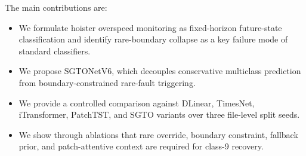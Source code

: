 The main contributions are:
\begin{itemize}
\item We formulate hoister overspeed monitoring as fixed-horizon future-state classification and identify rare-boundary collapse as a key failure mode of standard classifiers.
\item We propose SGTONetV6, which decouples conservative multiclass prediction from boundary-constrained rare-fault triggering.
\item We provide a controlled comparison against DLinear, TimesNet, iTransformer, PatchTST, and SGTO variants over three file-level split seeds.
\item We show through ablations that rare override, boundary constraint, fallback prior, and patch-attentive context are required for class-9 recovery.
\end{itemize}
